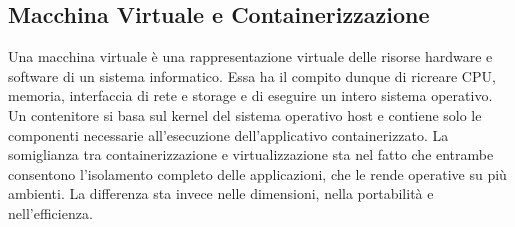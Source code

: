 \subsection{Macchina Virtuale e Containerizzazione}
Una macchina virtuale è una rappresentazione virtuale delle risorse hardware e software di un sistema informatico. Essa ha il compito dunque di ricreare CPU, memoria, interfaccia di rete e storage e di eseguire un intero sistema operativo.
Un contenitore si basa sul kernel del sistema operativo host e contiene solo le componenti necessarie all'esecuzione dell'applicativo containerizzato.
La somiglianza tra containerizzazione e virtualizzazione sta nel fatto che entrambe consentono l'isolamento completo delle applicazioni, che le rende operative su più ambienti. La differenza sta invece nelle dimensioni, nella portabilità e nell'efficienza.